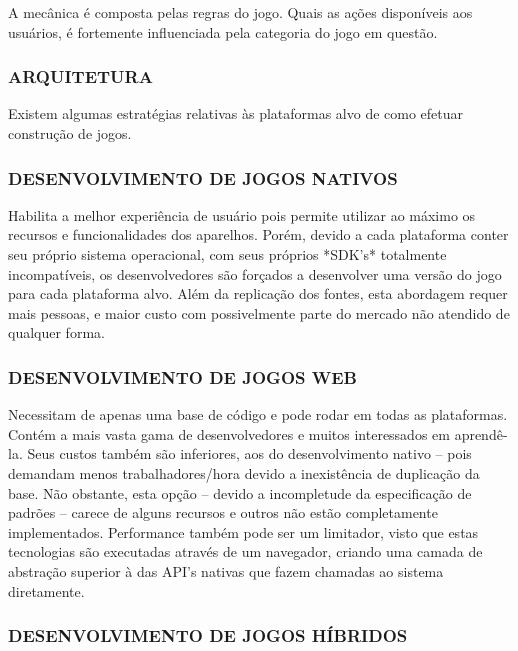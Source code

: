 \documentclass[11pt,a4paper]{article}
\begin{document}
A mecânica é composta pelas regras do jogo. Quais as ações
disponíveis aos usuários, é fortemente influenciada pela categoria do
jogo em questão.

\subsubsection{ARQUITETURA}

Existem algumas estratégias relativas às plataformas alvo de como
efetuar construção de jogos.

\subsubsection{DESENVOLVIMENTO DE JOGOS NATIVOS}

Habilita a melhor experiência de usuário pois permite utilizar ao
máximo os recursos e funcionalidades dos aparelhos. Porém, devido
a cada plataforma conter seu próprio sistema operacional, com seus
próprios *SDK's* totalmente incompatíveis, os desenvolvedores são
forçados a desenvolver uma versão do jogo para cada plataforma alvo.
Além da replicação dos fontes, esta abordagem requer mais pessoas, e
maior custo com possivelmente parte do mercado não atendido de qualquer
forma.

\subsubsection{DESENVOLVIMENTO DE JOGOS WEB}

Necessitam de apenas uma base de código e pode rodar em todas as      
plataformas. Contém a mais vasta gama de desenvolvedores e muitos      
interessados em aprendê-la. Seus custos também são inferiores, aos  
do desenvolvimento nativo – pois demandam menos trabalhadores/hora   
devido a inexistência de duplicação da base. Não obstante, esta     
opção – devido a incompletude da especificação de padrões       
– carece de alguns recursos e outros não estão completamente       
implementados. Performance também pode ser um limitador, visto que    
estas tecnologias são executadas através de um navegador, criando uma
camada de abstração superior à das API's nativas que fazem chamadas 
ao sistema diretamente.                                                 

\subsubsection{DESENVOLVIMENTO DE JOGOS HÍBRIDOS}
\end{document}
